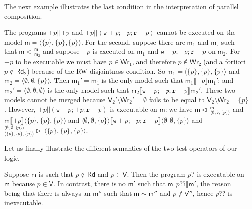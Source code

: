 \documentclass{llncs}
\newcommand{\modl}{\mathsf m}
\newcommand{\mrg}[3]{ ^{#2}_{#3} \triangleright \, #1 }
\newcommand{\pll}{ {||} }							%
\newcommand{\splt}[3]{ #1 \triangleleft \, ^{#2}_{#3} }
\newcommand{\readset}{\mathsf{Rd}}
\newcommand{\valuset}{\mathsf{V}}
\newcommand{\writeset}{\mathsf{Wr}}
\newcommand{\testendo}{?\!\!?}			%
\newcommand{\testpdl}{?}				%
\newcommand{\assgnbotR}[1]{{\mathtt r {-} #1}}
\newcommand{\assgntopW}[1]{{\mathtt w {+} #1}}
\newcommand{\assgnbotW}[1]{{\mathtt w {-} #1}}
\newcommand{\assgntopV}[1]{{\mathtt {+} #1}}
\newcommand{\assgnbotV}[1]{{\mathtt {-} #1}}
\newcommand{\intPgm}[1]{\llbracket #1 \rrbracket}
\renewcommand{\phi}{\varphi}
\newcommand{\tuple}[1]{ \langle #1 \rangle}
\begin{document}
The next example illustrates the last condition in the interpretation of parallel composition.

\begin{example}
The programs 
$\assgntopV p \pll \assgntopV p $ and
$\assgntopV p \pll (\assgntopW p ; \assgnbotV p ; \assgnbotR p ) $
cannot be executed on the model $\modl = \tuple{ \{p\}, \{p\}, \{p\} }$. 
For the second, suppose there are $\modl_1$ and $\modl_2$ such that $\splt{\modl}{\modl_1} {\modl_2}$ and 
suppose $\assgntopV p$ is executed on $\modl_1$ and 
$\assgntopW p ; \assgnbotV p ; \assgnbotR p$ on $\modl_2$.
For $\assgntopV p$ to be executable we must have $p \in \writeset_1$, and therefore
$p \notin \writeset_2$ (and a fortiori $p \notin \readset_2$) because of the RW-disjointness condition. 
So $\modl_1 = \tuple{ \{p\}, \{p\}, \{p\} }$ and $\modl_2 = \tuple{ \emptyset, \emptyset, \{p\} }$.
Then 
$\modl_1' = \modl_1$ is the only model such that $\modl_1 \intPgm{ \assgntopV p } \modl_1' $; and 
$\modl_2' = \tuple{ \emptyset, \emptyset, \emptyset }$ is the only model such that $\modl_2 \intPgm{ \assgntopW p ; \assgnbotV p ; \assgnbotR p } \modl_2' $.
These two models cannot be merged because 
$\valuset_2' \setminus \writeset_2' %
= \emptyset$ 
fails to be equal to 
$\valuset_2 \setminus \writeset_2 = \{p\}$. 
%
However, $\assgntopV p \pll ( \assgntopW p ; \assgntopV p ; \assgnbotR p )$
is executable on $\modl$: we have
$\splt{\modl}{\modl}{\tuple{\emptyset,\emptyset,\{p\}}}$ and 
$\modl \intPgm{\assgntopV p} \tuple{\{p\},\{p\},\{p\}}$ and
$\tuple{\emptyset,\emptyset,\{p\}} \intPgm{ \assgntopW p ; \assgntopV p ; \assgnbotR p } \tuple{\emptyset,\emptyset,\{p\} } $ and
$\mrg
{ \tuple{\{p\},\{p\},\{p\}} }
{ \tuple{\emptyset,\emptyset,\{p\}} }
{ \tuple{\{p\},\{p\},\{p\}} }$.
\end{example}

Let us finally illustrate the different semantics of the two test operators of our logic.

\begin{example}
Suppose $\modl$ is such that $p \notin \readset$ and $p \in \valuset$. 
Then the program $p \testpdl$ is executable on $\modl$ because $p \in \valuset$.
In contrast, there is no $\modl'$ such that $\modl \intPgm{ p \testendo } \modl'$, 
the reason being that there is always an $\modl''$ such that $\modl \sim \modl''$ and $p \notin \valuset''$,
hence $p \testendo$ is inexecutable. %
\end{example}
\end{document}
